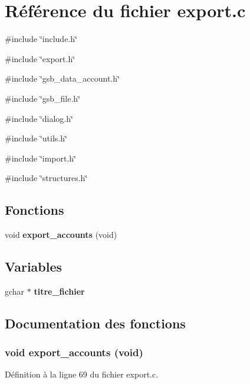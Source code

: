 \section{Référence du fichier export.c}
\label{export_8c}
{\ttfamily \#include \char`\"{}include.h\char`\"{}}\par
{\ttfamily \#include \char`\"{}export.h\char`\"{}}\par
{\ttfamily \#include \char`\"{}gsb\_\-data\_\-account.h\char`\"{}}\par
{\ttfamily \#include \char`\"{}gsb\_\-file.h\char`\"{}}\par
{\ttfamily \#include \char`\"{}dialog.h\char`\"{}}\par
{\ttfamily \#include \char`\"{}utils.h\char`\"{}}\par
{\ttfamily \#include \char`\"{}import.h\char`\"{}}\par
{\ttfamily \#include \char`\"{}structures.h\char`\"{}}\par
\subsection*{Fonctions}
\begin{DoxyCompactItemize}
\item 
void {\bf export\_\-accounts} (void)
\end{DoxyCompactItemize}
\subsection*{Variables}
\begin{DoxyCompactItemize}
\item 
gchar $\ast$ {\bf titre\_\-fichier}
\end{DoxyCompactItemize}


\subsection{Documentation des fonctions}
\subsubsection[{export\_\-accounts}]{\setlength{\rightskip}{0pt plus 5cm}void export\_\-accounts (void)}\label{export_8c_a9aac8675a6963d748b4c566cd5a8912c}


Définition à la ligne 69 du fichier export.c.



